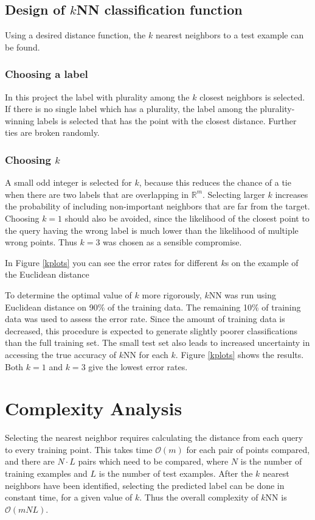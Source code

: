 \documentclass[10pt,twocolumn,letterpaper]{article}
\begin{document}
\subsection{Design of $k$NN classification function}
\label{kNN}
Using a desired distance function, the $k$ nearest neighbors to a test example can be found.

\subsubsection*{Choosing a label}
In this project the label with plurality among the $k$ closest neighbors is selected.  If there is no single label which has a plurality, the label among the plurality-winning labels is selected that has the point with the closest distance. Further ties are broken randomly.
  
\subsubsection*{Choosing $k$}

A small odd integer is selected for $k$, because this reduces the chance of a tie when there are two labels that are overlapping in $\mathbb{R}^m$.
Selecting larger $k$ increases the probability of including non-important neighbors that are far from the target.
Choosing $k=1$ should also be avoided, since the likelihood of the closest point to the query having the wrong label is much lower than the likelihood of multiple wrong points. Thus $k=3$ was chosen as a sensible compromise.

In Figure \ref{kplots} you can see the error rates for different $k$s on the example of the Euclidean distance 

To determine the optimal value of $k$ more rigorously, $k$NN was run using Euclidean distance on 90\% of the training data. The remaining 10\% of training data was used to assess the error rate. Since the amount of training data is decreased, this procedure is expected to generate slightly poorer classifications than the full training set. The small test set also leads to increased uncertainty in accessing the true accuracy of $k$NN for each $k$. Figure \ref{kplots} shows the results. Both $k=1$ and $k=3$ give the lowest error rates.


\section{Complexity Analysis}
Selecting the nearest neighbor requires calculating the distance from each query to every training point. This takes time $\mathcal{O}(m)$ for each pair of points compared, and there are $N\cdot L$ pairs which need to be compared, where $N$ is the number of training examples and $L$ is the number of test examples. After the $k$ nearest neighbors have been identified, selecting the predicted label can be done in constant time, for a given value of $k$. Thus the overall complexity of $k$NN is $\mathcal{O}(mNL)$.
\end{document}
